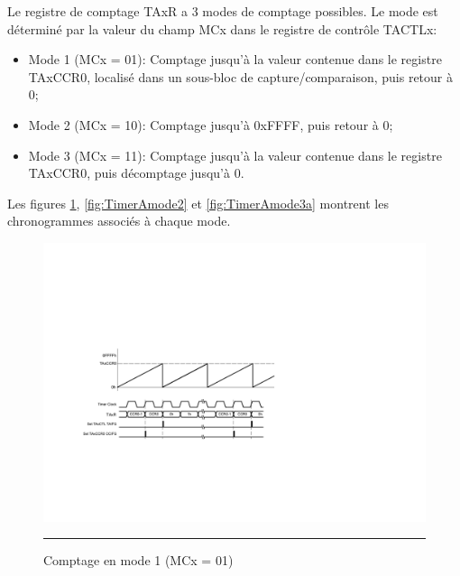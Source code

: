 Le registre de comptage TAxR a 3 modes de comptage possibles. Le mode est déterminé par la valeur du champ MCx dans le registre de contrôle TACTLx:
\begin{itemize}[label=\textbullet,font=\small]
\item Mode 1 (MCx = 01): Comptage jusqu'à la valeur contenue dans le registre TAxCCR0, localisé dans un sous-bloc de capture/comparaison, puis retour à 0;
\item Mode 2 (MCx = 10): Comptage jusqu'à 0xFFFF, puis retour à 0;
\item Mode 3 (MCx = 11): Comptage jusqu'à la valeur contenue dans le registre TAxCCR0, puis décomptage jusqu'à 0.
\end{itemize}

Les figures \ref{fig:TimerAmode1}, \ref{fig:TimerAmode2} et \ref{fig:TimerAmode3a} montrent les chronogrammes associés à chaque mode.
\begin{figure}[H]
  \centering
  \includegraphics[angle=0, width=14cm]{./Figures/Chap5_Timer/Timer_Mode_1.pdf}
  \rule{35em}{0.5pt}
  \caption[TimerA Mode 1]{Comptage en mode 1 (MCx = 01)}
  \label{fig:TimerAmode1}
\end{figure}

